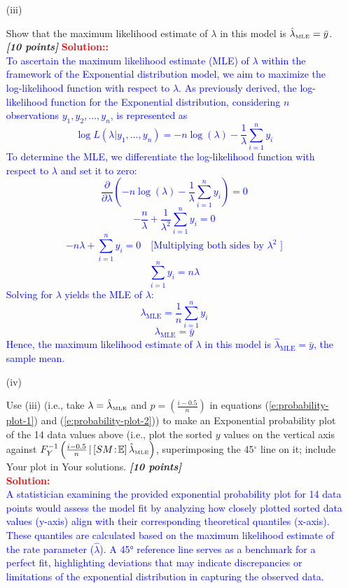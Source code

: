 \documentclass[12pt]{article}
\newcommand{\given}{\, | \,}
\newcommand{\bi}[1]{\b{\i{#1}}}
\renewcommand{\b}[1]{\textbf{#1}}
\renewcommand{\i}[1]{\textit{#1}}
\begin{document}
\begin{itemize}
\begin{itemize}
\begin{itemize}
\begin{itemize}
\item[(iii)]

Show that the maximum likelihood estimate of $\lambda$ in this model is $\hat{ \lambda }_{\mbox{\tiny MLE}} = \bar{ y }$. \bi{[10 points]}
\textcolor{red}{\textbf{Solution::}} \\
\textcolor{blue}{
To ascertain the maximum likelihood estimate (MLE) of \(\lambda\) within the framework of the Exponential distribution model, we aim to maximize the log-likelihood function with respect to \(\lambda\). As previously derived, the log-likelihood function for the Exponential distribution, considering \(n\) observations \(y_1, y_2, \ldots, y_n\), is represented as
\[
\log L(\lambda | y_1, \ldots, y_n) = -n\log(\lambda) - \frac{1}{\lambda}\sum_{i=1}^{n} y_i
\]
To determine the MLE, we differentiate the log-likelihood function with respect to \(\lambda\) and set it to zero:
\[
\frac{\partial}{\partial \lambda}\left(-n\log(\lambda) - \frac{1}{\lambda}\sum_{i=1}^{n} y_i\right) = 0
\]
\[
-\frac{n}{\lambda} + \frac{1}{\lambda^2}\sum_{i=1}^{n} y_i = 0
\]
\[
-n\lambda + \sum_{i=1}^{n} y_i = 0 \quad \text{[Multiplying both sides by \(\lambda^2\) ]}
\]
\[
\sum_{i=1}^{n} y_i = n\lambda
\]
Solving for \(\lambda\) yields the MLE of \(\lambda\):
\[
\lambda_{\text{MLE}} = \frac{1}{n}\sum_{i=1}^{n} y_i
\]
\[
\lambda_{\text{MLE}} = \bar{y}
\]
Hence, the maximum likelihood estimate of \(\lambda\) in this model is \(\hat{\lambda}_{\text{MLE}} = \bar{y}\), the sample mean.
}
\item[(iv)]

Use (iii) (i.e., take $\lambda = \hat{ \lambda }_{\mbox{\tiny MLE}}$ and $p = \left( \frac{ i - 0.5 }{ n } \right)$ in equations (\ref{e:probability-plot-1}) and (\ref{e:probability-plot-2})) to make an Exponential probability plot of the 14 data values above (i.e., plot the sorted $y$ values on the vertical axis against $F_Y^{ -1 } \left( \frac{ i - 0.5 }{ n } \given [ SM \! : \! \mathbb{ E } ] \,  \hat{ \lambda }_{\mbox{\tiny MLE}} \right)$, superimposing the 45$^\circ$ line on it; include Your plot in Your solutions. \bi{[10 points]} \\
\textcolor{red}{\textbf{Solution:}} \\
\textcolor{blue}{A statistician examining the provided exponential probability plot for 14 data points would assess the model fit by analyzing how closely plotted sorted data values (y-axis) align with their corresponding theoretical quantiles (x-axis). These quantiles are calculated based on the maximum likelihood estimate of the rate parameter ($\hat{\lambda}$). A 45° reference line serves as a benchmark for a perfect fit, highlighting deviations that may indicate discrepancies or limitations of the exponential distribution in capturing the observed data.}


\end{itemize}
\end{itemize}
\end{itemize}
\end{itemize}
\end{document}
